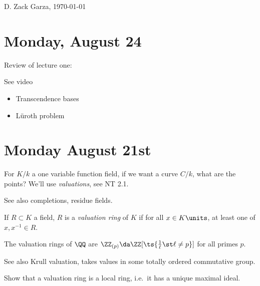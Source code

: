 \newpage
\tableofcontents

\medskip
\begin{flushright}
  D. Zack Garza, \today \\
  \currenttime
\end{flushright}

\hypertarget{monday-august-24}{%
\section{Monday, August 24}\label{monday-august-24}}

Review of lecture one:

\begin{theorem}

See video

\end{theorem}

\begin{itemize}
\tightlist
\item
  Transcendence bases
\item
  Lüroth problem
\end{itemize}

\hypertarget{monday-august-21st}{%
\section{Monday August 21st}\label{monday-august-21st}}

For \(K/k\) a one variable function field, if we want a curve \(C/k\),
what are the points? We'll use \emph{valuations}, see NT 2.1.

See also completions, residue fields.

If \(R \subset K\) a field, \(R\) is a \emph{valuation ring} of \(K\) if
for all \(x\in K\units\), at least one of \(x, x^{-1} \in R\).

\begin{example}

The valuation rings of \(\QQ\) are
\(\ZZ_{(p)}\da \ZZ[\ts{{1\over \ell} \st \ell\neq p}]\) for all primes
\(p\).

\end{example}

See also Krull valuation, takes values in some totally ordered
commutative group.

\begin{exercise}

Show that a valuation ring is a local ring, i.e.~it has a unique maximal
ideal.

\end{exercise}

